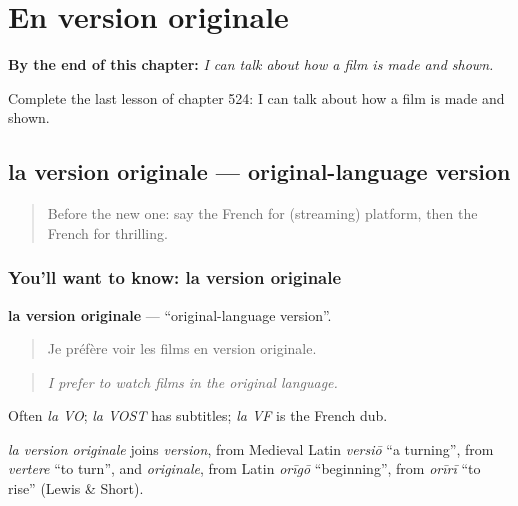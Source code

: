 
\chapter{En version originale}
\label{ch:fr-en-version-originale}

\begin{chapteropening}
\textbf{By the end of this chapter:} \emph{I can talk about how a film is made and shown.}

Complete the last lesson of chapter 524: I can talk about how a film is made and shown.
\end{chapteropening}

\section[la version originale]{la version originale — original-language version}

\label{lesson:FR-C524-version-originale}



\begin{quote}
Before the new one: say the French for (streaming) platform, then the French for thrilling.
\end{quote}

\subsection*{You'll want to know: la version originale}
\textbf{la version originale} — \textquotedblleft{}original-language version\textquotedblright{}.

\begin{quote}
Je préfère voir les films en version originale.
\end{quote}

\begin{quote}
\emph{I prefer to watch films in the original language.}
\end{quote}

Often \emph{la VO}; \emph{la VOST} has subtitles; \emph{la VF} is the French dub.

\begin{cousinweb}
\emph{la version originale} joins \emph{version}, from Medieval Latin \emph{versiō} \textquotedblleft{}a turning\textquotedblright{}, from \emph{vertere} \textquotedblleft{}to turn\textquotedblright{}, and \emph{originale}, from Latin \emph{orīgō} \textquotedblleft{}beginning\textquotedblright{}, from \emph{orīrī} \textquotedblleft{}to rise\textquotedblright{} (Lewis \& Short).
\end{cousinweb}

